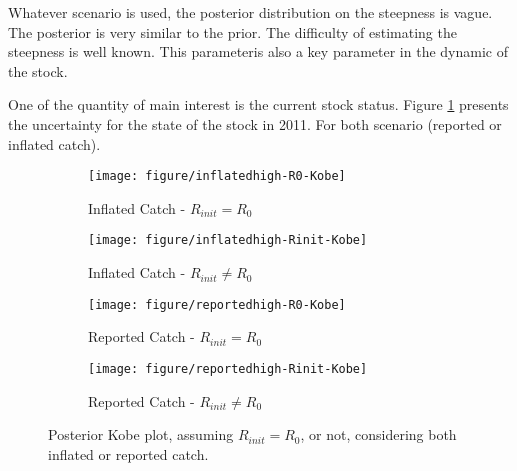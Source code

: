 Whatever scenario is used, the posterior distribution on the steepness is vague.  The posterior is very similar to the prior. The difficulty of estimating the steepness is well known. This parameteris also a key parameter in the dynamic of the stock.


 One of the quantity of main interest is the current  stock status. 
 Figure \ref{fig:postKobe} presents the uncertainty for the state of the stock in 2011.
 For both scenario (reported or inflated catch).
\begin{figure}[htbp]
 \begin{subfigure}[b]{0.45\textwidth}
 \texttt{[image: figure/inflatedhigh-R0-Kobe]}
  \caption{Inflated Catch - $R_{init}=R_0$}
  \end{subfigure} \hfill
 \begin{subfigure}[b]{0.45\textwidth} 
 \texttt{[image: figure/inflatedhigh-Rinit-Kobe]}
  \caption{Inflated Catch - $R_{init}\ne R_0$}
  \end{subfigure}
 \begin{subfigure}[b]{0.45\textwidth}
 \texttt{[image: figure/reportedhigh-R0-Kobe]}
  \caption{Reported Catch - $R_{init}=R_0$}
  \end{subfigure} \hfill
 \begin{subfigure}[b]{0.45\textwidth} 
 \texttt{[image: figure/reportedhigh-Rinit-Kobe]}
  \caption{Reported Catch - $R_{init}\ne R_0$}
  \end{subfigure}
  \caption{Posterior Kobe plot, assuming $R_{init}=R_0$, or not, considering both inflated or reported catch.}
  \label{fig:postKobe}
 \end{figure}
 
 
